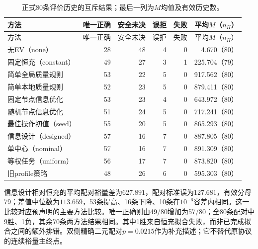 \documentclass[UTF8,fontset=fandol,11pt,a4paper]{ctexart}
\begin{document}
{\small
\begin{longtable}{L{.31\textwidth}rrrrr}
\caption{正式80条评价历史的互斥结果；最后一列为$M$均值及有效历史数。}\label{tab:information-outcomes-v3}\\
\toprule
方法 & 唯一正确 & 安全未决 & 误拒 & 失败 & 平均$M$（$n_H$）\\
\midrule\endfirsthead
\toprule
方法 & 唯一正确 & 安全未决 & 误拒 & 失败 & 平均$M$（$n_H$）\\
\midrule\endhead
无EV（none） &28&48&4&0&4.670（80）\\
固定恒充（constant） &49&27&3&1&225.704（79）\\
简单全局质量规则 &53&22&5&0&917.562（80）\\
简单本地质量规则 &52&23&5&0&879.411（80）\\
固定节点信息优化 &53&23&4&0&643.972（80）\\
随机节点信息优化 &51&24&5&0&717.241（80）\\
最佳操作初值（seed） &55&20&5&0&865.293（80）\\
信息设计（designed） &57&16&7&0&887.805（80）\\
单中心（nominal） &57&16&7&0&891.309（80）\\
等权任务（uniform） &56&17&7&0&873.820（80）\\
旧profile策略 &48&26&6&0&595.303（80）\\
\bottomrule
\end{longtable}}

信息设计相对恒充的平均配对裕量差为$627.891$，配对标准误为$127.681$，有效分母79；差值中位数为$113.659$，53条提高、16条下降、10条在$10^{-6}$容差内相同。这一比较对应预声明的主要方法比较。唯一正确则由49/80增加为57/80；全80条配对中9胜、1负，其余70条两方法结果相同。其中1胜来自恒充拟合失败，而非已完成拟合之间的额外排错。双侧精确二元配对$p=0.0215$作为补充描述；它不替代原协议的连续裕量主终点。
\end{document}
